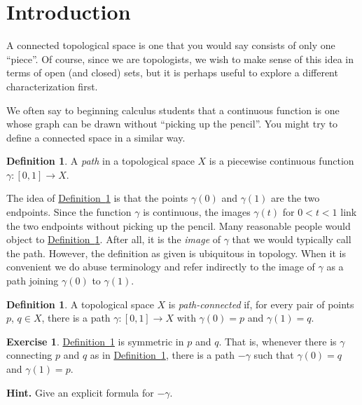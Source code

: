 \documentclass[10pt,]{article}
\theoremstyle{plain}
\theoremstyle{definition}
\newtheorem{definition}[theorem]{Definition}
\newtheorem{exercise}[theorem]{Exercise}
\newcommand{\lt}{ < }
\begin{document}
\section[Introduction]{Introduction}\label{t-conn-introduction}
A connected topological space is one that you would say consists of only one ``piece''. Of course, since we are topologists, we wish to make sense of this idea in terms of open (and closed) sets, but it is perhaps useful to explore a different characterization first.%
\par
We often say to beginning calculus students that a continuous function is one whose graph can be drawn without ``picking up the pencil''. You might try to define a connected space in a similar way.%
\begin{definition}\label{t-conn-def-path}
A \emph{path} in a topological space \(X\) is a piecewise continuous function \(\gamma \colon [0, 1] \to X\).%
\end{definition}
\par
The idea of \hyperref[t-conn-def-path]{Definition~\ref{t-conn-def-path}} is that the points \(\gamma(0)\) and \(\gamma(1)\) are the two endpoints. Since the function \(\gamma\) is continuous, the images \(\gamma(t)\) for \(0 \lt t \lt 1\) link the two endpoints without picking up the pencil. Many reasonable people would object to \hyperref[t-conn-def-path]{Definition~\ref{t-conn-def-path}}. After all, it is the \emph{image} of \(\gamma\) that we would typically call the path. However, the definition as given is ubiquitous in topology. When it is convenient we do abuse terminology and refer indirectly to the image of \(\gamma\) as a path joining \(\gamma(0)\) to \(\gamma(1)\).%
\begin{definition}\label{t-conn-def-path-connected-space}
A topological space \(X\) is \emph{path-connected} if, for every pair of points \(p\), \(q \in X\), there is a path \(\gamma \colon [0, 1] \to X\) with \(\gamma(0) = p\) and \(\gamma(1) = q\).%
\end{definition}
\begin{exercise}\label{t-conn-reverse-paths}
\hyperref[t-conn-def-path-connected-space]{Definition~\ref{t-conn-def-path-connected-space}} is symmetric in \(p\) and \(q\). That is, whenever there is \(\gamma\) connecting \(p\) and \(q\) as in \hyperref[t-conn-def-path-connected-space]{Definition~\ref{t-conn-def-path-connected-space}}, there is a path \(-\gamma\) such that \(\gamma(0) = q\) and \(\gamma(1) = p\).%
\par\smallskip
\noindent\textbf{Hint.}\hypertarget{hint-1}{}\quad
Give an explicit formula for \(-\gamma\).%
\end{exercise}
\end{document}
